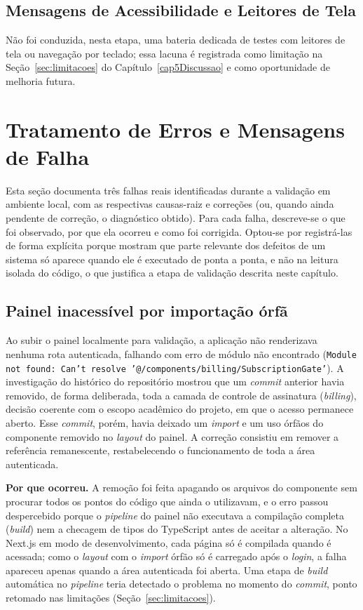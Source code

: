 \subsection{Mensagens de Acessibilidade e Leitores de Tela}

Não foi conduzida, nesta etapa, uma bateria dedicada de testes com leitores de tela ou navegação por teclado; essa lacuna é registrada como limitação na Seção~\ref{sec:limitacoes} do Capítulo~\ref{cap5Discussao} e como oportunidade de melhoria futura.

\section{Tratamento de Erros e Mensagens de Falha}
\label{sec:tratamento-de-erros}

Esta seção documenta três falhas reais identificadas durante a validação em ambiente local, com as respectivas causas-raiz e correções (ou, quando ainda pendente de correção, o diagnóstico obtido). Para cada falha, descreve-se o que foi observado, por que ela ocorreu e como foi corrigida. Optou-se por registrá-las de forma explícita porque mostram que parte relevante dos defeitos de um sistema só aparece quando ele é executado de ponta a ponta, e não na leitura isolada do código, o que justifica a etapa de validação descrita neste capítulo.

\subsection{Painel inacessível por importação órfã}
\label{sec:falha-importacao-orfa}

Ao subir o painel localmente para validação, a aplicação não renderizava nenhuma rota autenticada, falhando com erro de módulo não encontrado (\texttt{Module not found: Can't resolve '@/\allowbreak{}components/\allowbreak{}billing/\allowbreak{}SubscriptionGate'}). A investigação do histórico do repositório mostrou que um \textit{commit} anterior havia removido, de forma deliberada, toda a camada de controle de assinatura (\textit{billing}), decisão coerente com o escopo acadêmico do projeto, em que o acesso permanece aberto. Esse \textit{commit}, porém, havia deixado um \textit{import} e um uso órfãos do componente removido no \textit{layout} do painel. A correção consistiu em remover a referência remanescente, restabelecendo o funcionamento de toda a área autenticada.

\textbf{Por que ocorreu.} A remoção foi feita apagando os arquivos do componente sem procurar todos os pontos do código que ainda o utilizavam, e o erro passou despercebido porque o \textit{pipeline} do painel não executava a compilação completa (\textit{build}) nem a checagem de tipos do TypeScript antes de aceitar a alteração. No Next.js em modo de desenvolvimento, cada página só é compilada quando é acessada; como o \textit{layout} com o \textit{import} órfão só é carregado após o \textit{login}, a falha apareceu apenas quando a área autenticada foi aberta. Uma etapa de \textit{build} automática no \textit{pipeline} teria detectado o problema no momento do \textit{commit}, ponto retomado nas limitações (Seção~\ref{sec:limitacoes}).

